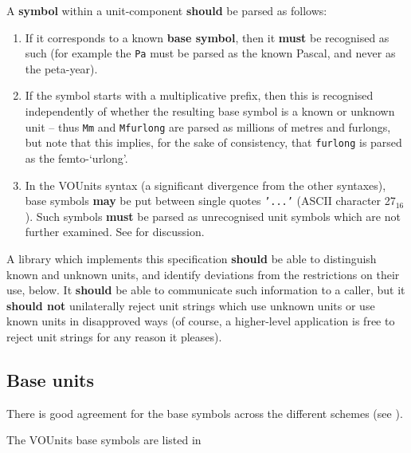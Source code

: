 \documentclass[11pt,a4paper]{ivoa}
\newcommand{\unit}[1]{\texttt{\small\color{orange}#1}}
\newcommand*\hex[1]{\uppercase{#1}${}_{16}$}
\newcommand*\norm[1]{\textbf{\color{ivoacolor}#1}}
\begin{document}
A \textbf{symbol} within a unit-component \norm{should} be parsed as follows:
\begin{enumerate}
\item If it corresponds to a known \textbf{base symbol}, then it
\norm{must} be recognised as such (for example the \unit{Pa} must be
parsed as the known Pascal, and never as the peta-year).

\item If the symbol starts with a multiplicative prefix, then this is
recognised independently of whether the resulting base symbol is a
known or unknown unit -- thus \unit{Mm} and \unit{Mfurlong} are parsed
as millions of metres and furlongs, but note that this implies, for
the sake of consistency, that \unit{furlong} is parsed as the
femto-`urlong'.

\item In the VOUnits syntax (a significant divergence from the other
syntaxes), base symbols \norm{may} be put between single
quotes \unit{'...'} (ASCII character \hex{27}).
Such symbols \norm{must} be parsed as
unrecognised unit symbols which are not further examined.
See  for discussion.
\end{enumerate}

A library which implements this specification \norm{should} be able to
distinguish known and unknown units, and identify deviations from the
restrictions on their use, below.  It \norm{should} be able to
communicate such information to a caller, but it \norm{should not}
unilaterally reject unit strings which use unknown units or use known
units in disapproved ways (of course, a higher-level application is
free to reject unit strings for any reason it pleases).

\subsection{Base units\label{sec:baseUnits}}

There is good agreement for the base symbols across the different schemes
(see ).

The VOUnits base symbols are listed in 
\end{document}
